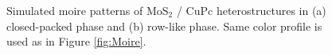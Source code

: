 \documentclass[12pt]{article}
\begin{document}
\begin{figure}[H]
\centering
{}\hspace{0pt}
\caption{Simulated moire patterns of MoS$_2$ / CuPc heterostructures in (a) closed-packed phase and (b) row-like phase. Same color profile is used as in Figure \ref{fig:Moire}.}\label{fig:CuPc Moire}
\end{figure}
\end{document}
